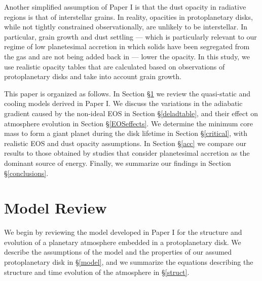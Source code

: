 \documentclass[apj]{emulateapj}
\begin{document}
 Another simplified assumption of Paper I is that the dust opacity in radiative regions is that of interstellar grains. In reality, opacities in protoplanetary disks, while not tightly constrained observationally, are unlikely to be interstellar. In particular, grain growth and dust settling --- which is particularly relevant to our regime of low planetesimal accretion in which solids have been segregated from the gas and are not being added back in --- lower the opacity. In this study, we use realistic opacity tables that are calculated based on observations of protoplanetary disks and take into account grain growth. %


This paper is organized as follows. In Section \S\ref{sec2} we review the quasi-static and cooling models derived in Paper I. We discuss the variations in the adiabatic gradient caused by the non-ideal EOS in Section \S\ref{deladtable}, and their effect on atmosphere evolution in Section \S\ref{EOSeffects}. We determine the minimum core mass to form a giant planet during the disk lifetime in Section \S\ref{critical}, with realistic EOS and dust opacity assumptions. In Section \S\ref{acc} we compare our results to those obtained by studies that consider planetesimal accretion as the dominant source of energy. Finally, we summarize our findings in Section \S\ref{conclusions}.



\section{Model Review}
\label{sec2}


We begin by reviewing the model developed in Paper I for the structure and evolution of a planetary atmosphere embedded in a protoplanetary disk. We describe the assumptions of the model and the properties of our assumed protoplanetary disk in \S\ref{model}, and we summarize the equations describing the structure and time evolution of the atmosphere in \S\ref{struct}.  
\end{document}
